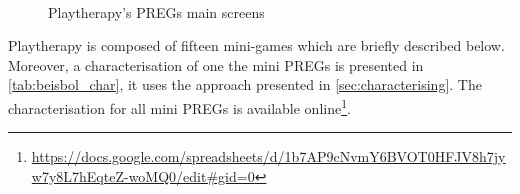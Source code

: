 \begin{figure}[bth]
\centering
{}
\\
\caption{Playtherapy's \acp{PREG} main screens}
\label{fig:platherapy_screens}
\end{figure}

Playtherapy is composed of fifteen mini-games which are briefly described below. Moreover, a characterisation of one the mini \acp{PREG} is presented in \autoref{tab:beisbol_char}, it uses the approach presented in \autoref{sec:characterising}. The characterisation for all mini \acp{PREG} is available online\footnote{\url{https://docs.google.com/spreadsheets/d/1b7AP9cNvmY6BVOT0HFJV8h7jyw7y8L7hEqteZ-woMQ0/edit\#gid=0}}.

